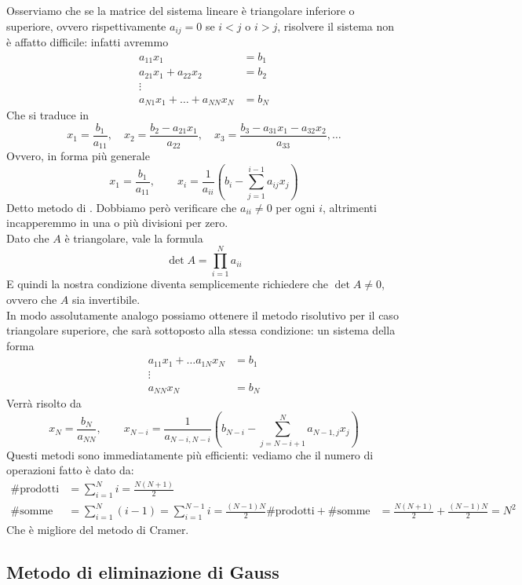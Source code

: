 \documentclass[openany]{book}
\begin{document}
Osserviamo che se la matrice del sistema lineare è triangolare inferiore o superiore, ovvero rispettivamente $a_{ij} = 0$ se $i<j$ o $i>j$, risolvere il sistema non è affatto difficile: infatti avremmo
\begin{align*}
    a_{11}x_1 & = b_1 \\
    a_{21}x_1 + a_{22}x_2 & = b_2\\
    \vdots & \\
    a_{N1}x_1 + \dots + a_{NN}x_N & = b_N
\end{align*}
Che si traduce in 
\[ x_1 = \frac{b_1}{a_{11}},\quad x_2 = \frac{b_2 - a_{21}x_1}{a_{22}}, \quad x_3 = \frac{b_3 - a_{31}x_1 - a_{32}x_2}{a_{33}},\dots  \]
Ovvero, in forma più generale 
\[ x_1 = \frac{b_1}{a_{11}}, \qquad x_i = \frac{1}{a_{ii}}\left( b_i - \sum_{j=1}^{i-1} a_{ij}x_j \right) \]
Detto metodo di . Dobbiamo però verificare che $a_{ii}\neq 0$ per ogni $i$, altrimenti incapperemmo in una o più divisioni per zero.\\
Dato che $A$ è triangolare, vale la formula 
\[ \det A = \prod_{i =1}^N a_{ii} \]
E quindi la nostra condizione diventa semplicemente richiedere che $\det A \neq 0$, ovvero che $A$ sia invertibile.\\
In modo assolutamente analogo possiamo ottenere il metodo risolutivo per il caso triangolare superiore, che sarà sottoposto alla stessa condizione: un sistema della forma 
\begin{align*}
    a_{11}x_1 + \dots a_{1N}x_N & = b_1\\
    \vdots & \\
    a_{NN}x_N & = b_N
\end{align*}
Verrà risolto da 
\[ x_N = \frac{b_N}{a_{NN}}, \qquad x_{N-i} = \frac{1}{a_{N-i,N-i}}\left( b_{N-i} - \sum_{j = N-i+1}^{N} a_{N-1, j}x_j \right) \]
Questi metodi sono immediatamente più efficienti: vediamo che il numero di operazioni fatto è dato da:
\begin{align*} 
    \# \text{prodotti} & = \sum_{i=1}^N i = \frac{N(N+1)}{2} \\
    \# \text{somme} & = \sum_{i=1}^{N} (i-1) = \sum_{i=1}^{N-1}i = \frac{(N-1)N}{2}
    \# \text{prodotti} + \# \text{somme} & = \frac{N(N+1)}{2} + \frac{(N-1)N}{2} = N^2
\end{align*}
Che è  migliore del metodo di Cramer.

\subsection{Metodo di eliminazione di Gauss}
\end{document}
